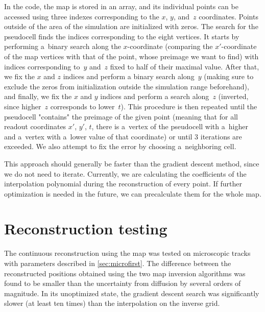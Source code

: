 			In the code, the map is stored in an array, and its individual points can be accessed using three indexes corresponding to the $x$, $y$, and~$z$ coordinates. Points outside of the area of the simulation are initialized with zeros. The search for the pseudocell finds the indices corresponding to the eight vertices. It starts by performing a~binary search along the $x$\nobreakdash-coordinate (comparing the $x'$\nobreakdash-coordinate of the map vertices with that of the point, whose preimage we want to find) with indices corresponding to~$y$ and~$z$ fixed to half of their maximal value. After that, we fix the $x$ and $z$ indices and perform a binary search along~$y$ (making sure to exclude the zeros from initialization outside the simulation range beforehand), and finally, we fix the $x$ and $y$ indices and perform a search along~$z$ (inverted, since higher~$z$ corresponds to lower~$t$). This procedure is then repeated until the pseudocell "contains" the preimage of the given point (meaning that for all readout coordinates $x'$, $y'$, $t$, there is a~vertex of the pseudocell with a~higher and a~vertex with a~lower value of that coordinate) or until 3 iterations are exceeded. We also attempt to fix the error by choosing a~neighboring cell.
			
			This approach should generally be faster than the gradient descent method, since we do not need to iterate. Currently, we are calculating the coefficients of the interpolation polynomial during the reconstruction of every point. If further optimization is needed in the future, we can precalculate them for the whole map.
			
		\section{Reconstruction testing}
			The continuous reconstruction using the map was tested on microscopic tracks with parameters described in \cref{sec:microfirst}. The difference between the reconstructed positions obtained using the two map inversion algorithms was found to be smaller than the uncertainty from diffusion by several orders of magnitude. In its unoptimized state, the gradient descent search was significantly slower (at least ten times) than the interpolation on the inverse grid.
			
